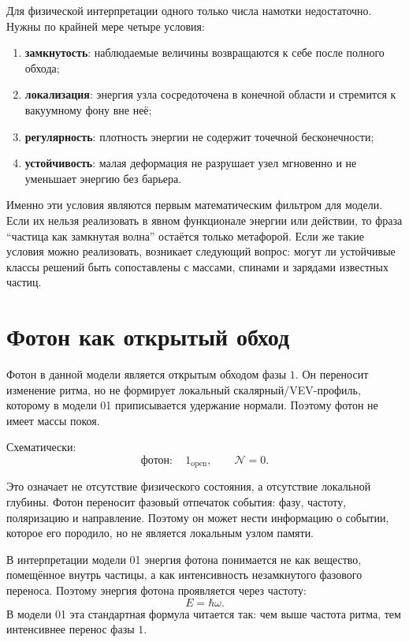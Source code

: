 \documentclass[11pt,a4paper]{article}
\newcommand{\normal}{\mathcal{N}}
\begin{document}
Для физической интерпретации одного только числа намотки недостаточно. Нужны по крайней мере четыре условия:
\begin{enumerate}
\item \textbf{замкнутость}: наблюдаемые величины возвращаются к себе после полного обхода;
\item \textbf{локализация}: энергия узла сосредоточена в конечной области и стремится к вакуумному фону вне неё;
\item \textbf{регулярность}: плотность энергии не содержит точечной бесконечности;
\item \textbf{устойчивость}: малая деформация не разрушает узел мгновенно и не уменьшает энергию без барьера.
\end{enumerate}

Именно эти условия являются первым математическим фильтром для модели. Если их нельзя реализовать в явном функционале энергии или действии, то фраза ``частица как замкнутая волна'' остаётся только метафорой. Если же такие условия можно реализовать, возникает следующий вопрос: могут ли устойчивые классы решений быть сопоставлены с массами, спинами и зарядами известных частиц.

\section{Фотон как открытый обход}

Фотон в данной модели является открытым обходом фазы $1$. Он переносит изменение ритма, но не формирует локальный скалярный/VEV-профиль, которому в модели 01 приписывается удержание нормали. Поэтому фотон не имеет массы покоя.

Схематически:
\begin{equation}
\text{фотон}: \quad 1_{\mathrm{open}}, \qquad \normal = 0.
\end{equation}

Это означает не отсутствие физического состояния, а отсутствие локальной глубины. Фотон переносит фазовый отпечаток события: фазу, частоту, поляризацию и направление. Поэтому он может нести информацию о событии, которое его породило, но не является локальным узлом памяти.

В интерпретации модели 01 энергия фотона понимается не как вещество, помещённое внутрь частицы, а как интенсивность незамкнутого фазового переноса. Поэтому энергия фотона проявляется через частоту:
\begin{equation}
E=\hbar\omega.
\end{equation}
В модели 01 эта стандартная формула читается так: чем выше частота ритма, тем интенсивнее перенос фазы $1$.
\end{document}

